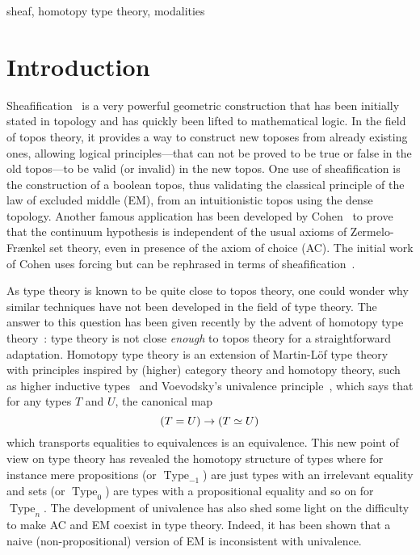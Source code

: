 \documentclass[preprint,9pt,numbers]{sigplanconf}
\DeclareMathOperator{\Type}{Type}
\newenvironment{mymath}[1][-0em]{%
  \newcommand\mymathaux{\vspace{#1}}%
  \vspace{#1}%
  \begin{equation*}%
  }{ %
    \mymathaux%
  \end{equation*}}
\begin{document}
\keywords
sheaf, homotopy type theory, modalities

\section{Introduction}
\label{sec:intro}

Sheafification~\cite{maclanemoerdijk} is a very powerful geometric
construction that has been initially stated in topology and has
quickly been lifted to mathematical logic.
%
In the field of topos theory, it provides a way to construct new toposes
from already existing ones, allowing logical principles---that can not
be proved to be true or false in the old topos---to be valid (or
invalid) in the new topos.
%
One use of sheafification is the construction of a boolean
topos, thus validating the classical principle of the law of excluded
middle (EM), from an intuitionistic topos using the dense topology. 
%
Another famous application has been developed by
Cohen~\cite{cohen1966} to prove that the continuum hypothesis is
independent of the usual axioms of Zermelo-Fr\ae nkel set theory, even
in presence of the axiom of choice (AC). The initial work of Cohen
uses forcing but can be rephrased in terms of
sheafification~\cite{maclanemoerdijk}.

As type theory is known to be quite close to topos theory,
one could wonder why similar techniques have not been developed in the
field of type theory. 
%
The answer to this question has been given recently by the advent of
homotopy type theory~\cite{hottbook}: type theory is not close {\em
  enough} to topos theory for a straightforward adaptation. 
%
Homotopy type theory is an extension of
Martin-Löf type theory with principles inspired by (higher) category
theory and homotopy theory, such as higher inductive
types~\cite{lumsdaine2011higher,lumsdaine2013higher} and
Voevodsky's univalence principle~\cite{kapulkin2012simplicial}, which
says that for any types $T$ and $U$, the canonical map 
\begin{mymath}
(T = U) \to (T \simeq U)
\end{mymath}%
%
which transports equalities to equivalences is an equivalence.
%
This new point of view on type theory has revealed the homotopy
structure of types where for instance mere propositions (or
$\Type_{-1}$) are just types with an
irrelevant equality and sets (or $\Type_{0}$) are types
with a propositional equality and so on for $\Type_{n}$.
%
The development of univalence has also shed some light on the
difficulty to make AC and EM coexist in type theory. Indeed, it
has been shown that a naive (non-propositional) version of EM is
inconsistent with univalence.
\end{document}
